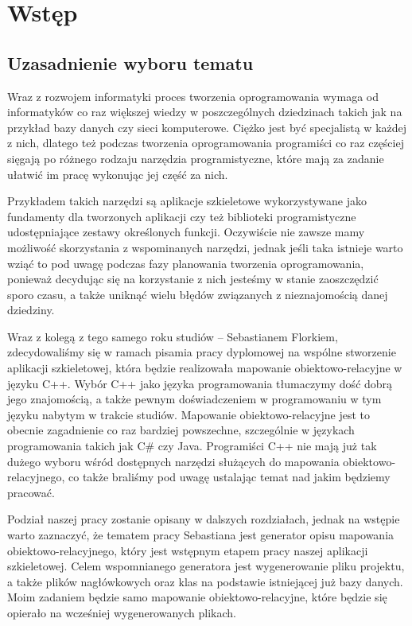 \documentclass[12pt]{report}
\begin{document}


\tableofcontents

\chapter{Wstęp} \label{wstep}

\section{Uzasadnienie wyboru tematu}

Wraz z rozwojem informatyki proces tworzenia oprogramowania wymaga od informatyków co raz większej wiedzy w poszczególnych dziedzinach takich jak na przykład bazy 
danych czy sieci komputerowe. Ciężko jest być specjalistą w każdej z nich, dlatego też podczas tworzenia oprogramowania programiści co raz częściej sięgają po różnego 
rodzaju narzędzia programistyczne, które mają za zadanie ułatwić im pracę wykonując jej część za nich.

Przykładem takich narzędzi są aplikacje szkieletowe wykorzystywane jako fundamenty dla tworzonych aplikacji czy też biblioteki programistyczne udostępniające zestawy 
określonych funkcji. Oczywiście nie zawsze mamy możliwość skorzystania z wspominanych narzędzi, jednak jeśli taka istnieje warto wziąć to pod uwagę podczas fazy planowania 
tworzenia  oprogramowania, ponieważ decydując się na korzystanie z nich jesteśmy w stanie zaoszczędzić sporo czasu, a także uniknąć wielu błędów związanych z nieznajomością 
danej dziedziny.

Wraz z kolegą z tego samego roku studiów -- Sebastianem Florkiem, zdecydowaliśmy się w ramach pisamia pracy dyplomowej na wspólne stworzenie aplikacji szkieletowej, 
która będzie realizowała mapowanie obiektowo-relacyjne w języku C++. Wybór C++ jako języka programowania tłumaczymy dość dobrą jego znajomością, a także pewnym
doświadczeniem w programowaniu w tym języku nabytym w trakcie studiów. Mapowanie obiektowo-relacyjne jest to obecnie zagadnienie co raz bardziej powszechne, szczególnie w 
językach programowania takich jak C\# czy Java. Programiści C++ nie mają już tak dużego wyboru wśród dostępnych narzędzi służących do mapowania 
obiektowo-relacyjnego, co także braliśmy pod uwagę ustalając temat nad jakim będziemy pracować.

Podział naszej pracy zostanie opisany w dalszych rozdziałach, jednak na wstępie warto zaznaczyć, że tematem pracy Sebastiana jest generator opisu mapowania 
obiektowo-relacyjnego, który jest wstępnym etapem pracy naszej aplikacji szkieletowej. Celem wspomnianego generatora jest wygenerowanie pliku projektu, a także plików
nagłówkowych oraz klas na podstawie istniejącej już bazy danych. Moim zadaniem będzie samo mapowanie obiektowo-relacyjne, które będzie się opierało na wcześniej
wygenerowanych plikach. 
\end{document}
